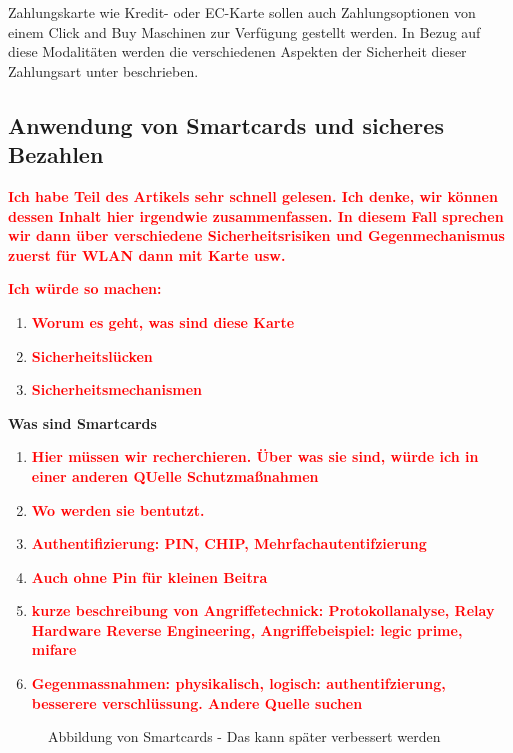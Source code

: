 Zahlungskarte wie Kredit- oder EC-Karte sollen auch Zahlungsoptionen von einem Click and Buy Maschinen
zur Verfügung gestellt werden. In Bezug auf diese Modalitäten werden die verschiedenen Aspekten der 
Sicherheit dieser Zahlungsart unter beschrieben.


\subsection{Anwendung von Smartcards und sicheres Bezahlen}
\textbf{\textcolor{red}{Ich habe Teil des Artikels sehr schnell gelesen. Ich denke, wir können dessen Inhalt hier
irgendwie zusammenfassen. In diesem Fall sprechen wir dann über verschiedene Sicherheitsrisiken und Gegenmechanismus
zuerst für WLAN dann mit Karte usw. \cite{refmas:ASSS}}}

\textbf{\textcolor{red}{Ich würde so machen:}}



\begin{enumerate}
    \item \textbf{\textcolor{red}{Worum es geht, was sind diese Karte}}
    \item \textbf{\textcolor{red}{Sicherheitslücken}}
    \item \textbf{\textcolor{red}{Sicherheitsmechanismen}}
\end{enumerate}

\textbf{Was sind Smartcards}
\begin{enumerate}
    \item \textbf{\textcolor{red}{Hier müssen wir recherchieren. Über was sie sind, würde ich in einer anderen QUelle Schutzmaßnahmen}}
    \item \textbf{\textcolor{red}{Wo werden sie bentutzt. }}
    \item \textbf{\textcolor{red}{Authentifizierung: PIN, CHIP, Mehrfachautentifzierung}}
    \item \textbf{\textcolor{red}{Auch ohne Pin für kleinen Beitra}}
    \item \textbf{\textcolor{red}{kurze beschreibung von Angriffetechnick: Protokollanalyse, Relay   Hardware Reverse Engineering, Angriffebeispiel: legic prime, mifare  }}
    \item \textbf{\textcolor{red}{Gegenmassnahmen: physikalisch, logisch: authentifzierung, besserere verschlüssung. Andere Quelle suchen }}
\end{enumerate}


\vfill
\begin{figure}[htb]
    \caption{Abbildung von Smartcards - Das kann später verbessert werden}
    \label{fig:refmas:ASSS}
\end{figure}
\vfill



